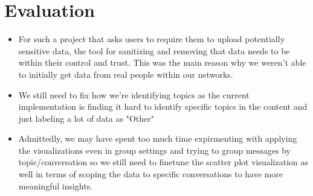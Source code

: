 \documentclass{article}\usepackage{graphicx}
\begin{document}
\section*{Evaluation}
\begin{itemize}
    \item For such a project that asks users to require them to upload potentially sensitive data, the tool for sanitizing and removing that data needs to be within their control and trust. This was the main reason why we weren't able to initially get data from real people within our networks. 
    \item We still need to fix how we're identifying topics as the current implementation is finding it hard to identify specific topics in the content and just labeling a lot of data as "Other"
    \item Admittedly, we may have spent too much time expirmenting with applying the visualizations even in group settings and trying to group messages by topic/conversation so we still need to finetune the scatter plot visualization as well in terms of scoping the data to specific conversations to have more meaningful insights. 
\end{itemize}
\end{document}
